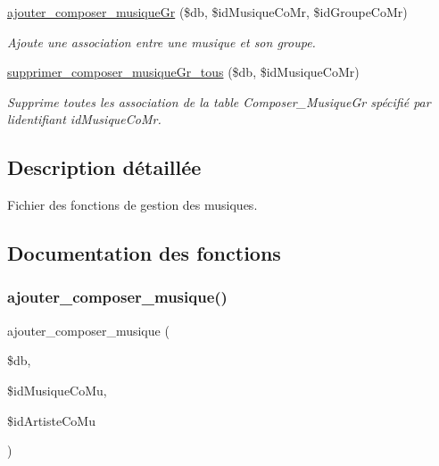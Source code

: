 \begin{DoxyCompactItemize}
\hyperlink{fonctionMusique_8php_aaec18ddf2a315f013b17fe9b72ef850b}{ajouter\+\_\+composer\+\_\+musique\+Gr} (\$db, \$id\+Musique\+Co\+Mr, \$id\+Groupe\+Co\+Mr)
\begin{DoxyCompactList}\small\item\em Ajoute une association entre une musique et son groupe. \end{DoxyCompactList}\item 
\hyperlink{fonctionMusique_8php_a3e655cbddf1539e8d07f245911fe7d5f}{supprimer\+\_\+composer\+\_\+musique\+Gr\+\_\+tous} (\$db, \$id\+Musique\+Co\+Mr)
\begin{DoxyCompactList}\small\item\em Supprime toutes les association de la table Composer\+\_\+\+Musique\+Gr spécifié par l\textquotesingle{}identifiant \textquotesingle{}id\+Musique\+Co\+Mr\textquotesingle{}. \end{DoxyCompactList}\end{DoxyCompactItemize}


\subsection{Description détaillée}
Fichier des fonctions de gestion des musiques. 



\subsection{Documentation des fonctions}
\mbox{\label{fonctionMusique_8php_a8caa427d79a466dc7a5515e4d7fd6e89}} 
\subsubsection{\texorpdfstring{ajouter\+\_\+composer\+\_\+musique()}{ajouter\_composer\_musique()}}
{\footnotesize\ttfamily ajouter\+\_\+composer\+\_\+musique (\begin{DoxyParamCaption}\item[{}]{\$db,  }\item[{}]{\$id\+Musique\+Co\+Mu,  }\item[{}]{\$id\+Artiste\+Co\+Mu }\end{DoxyParamCaption})}



